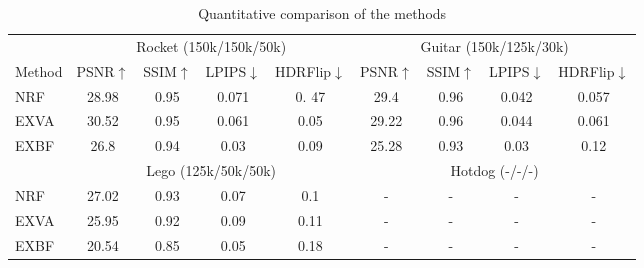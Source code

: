 \begingroup
\begin{table*}[!htb]
    \centering
    \caption{Quantitative comparison of the methods}
    \label{tab:colocated_metrics}
    \begin{tabular*}{\textwidth}{ l | c c c c | c c c c}
        & \multicolumn{4}{c}{Rocket (150k/150k/50k)} & \multicolumn{4}{c}{Guitar (150k/125k/30k)} \\
    	Method & PSNR$\uparrow$ & SSIM$\uparrow$ & LPIPS$\downarrow$ & HDRFlip$\downarrow$ & PSNR$\uparrow$ & SSIM$\uparrow$ & LPIPS$\downarrow$ & HDRFlip$\downarrow$ \\
        \midrule
        NRF & 28.98 & 0.95 & 0.071 & 0. 47 & 29.4 & 0.96 & 0.042 & 0.057 \\
        EXVA & 30.52 & 0.95 & 0.061 & 0.05 & 29.22 & 0.96 & 0.044 & 0.061 \\
        EXBF & 26.8 & 0.94 & 0.03 & 0.09 & 25.28 & 0.93 & 0.03 & 0.12 \\
        \midrule
        & \multicolumn{4}{c}{Lego (125k/50k/50k)} & \multicolumn{4}{c}{Hotdog (-/-/-)} \\
        \midrule
        NRF & 27.02 & 0.93 & 0.07 & 0.1 & - & - & - & - \\
        EXVA & 25.95 & 0.92 & 0.09 & 0.11 & - & - & - & - \\
        EXBF & 20.54 & 0.85 & 0.05 & 0.18 & - & - & - & - \\
    \end{tabular*}
\end{table*}
\endgroup

